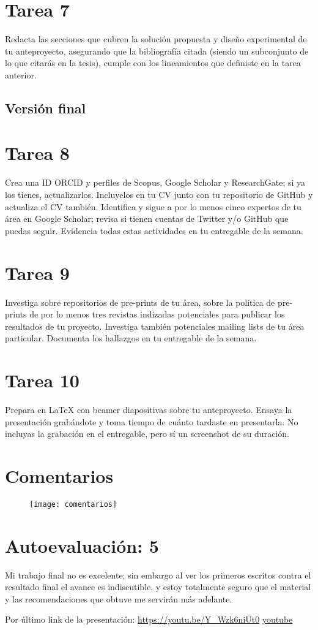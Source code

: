 \documentclass[12pt,letterpaper]{article}
\begin{document}
\section*{Tarea 7}
Redacta las secciones que cubren la solución propuesta y diseño experimental de tu anteproyecto, asegurando que la bibliografía citada (siendo un subconjunto de lo que citarás en la tesis), cumple con los lineamientos que definiste en la tarea anterior.

\subsection*{Versión final}

\section*{Tarea 8}
Crea una ID ORCID y perfiles de Scopus, Google Scholar y ResearchGate; si ya los tienes, actualizarlos. Incluyelos en tu CV junto con tu repositorio de GitHub y actualiza el CV también. Identifica y sigue a por lo menos cinco expertos de tu área en Google Scholar; revisa si tienen cuentas de Twitter y/o GitHub que puedas seguir. Evidencia todas estas actividades en tu entregable de la semana.

\section*{Tarea 9}
Investiga sobre repositorios de pre-prints de tu área, sobre la política de pre-prints de por lo menos tres revistas indizadas potenciales para publicar los resultados de tu proyecto. Investiga también potenciales mailing lists de tu área particular. Documenta los hallazgos en tu entregable de la semana.

\section*{Tarea 10}
Prepara en LaTeX con beamer diapositivas sobre tu anteproyecto. Ensaya la presentación grabándote y toma tiempo de cuánto tardaste en presentarla. No incluyas la grabación en el entregable, pero sí un screenshot de su duración.

\section*{Comentarios}
\begin{figure}[h!]
	\texttt{[image: comentarios]}
\end{figure}

\section*{Autoevaluación: 5 }
 Mi trabajo final no es excelente; sin embargo al ver los primeros escritos contra el resultado final el avance es indiscutible, y estoy totalmente seguro que el material y las recomendaciones que obtuve me servirán más adelante.
 
\vspace{1 cm}
Por último link de la presentación: \url{https://youtu.be/Y_Wzk6niUt0}
\href{https://youtu.be/Y_Wzk6niUt0}{youtube}
\end{document}
